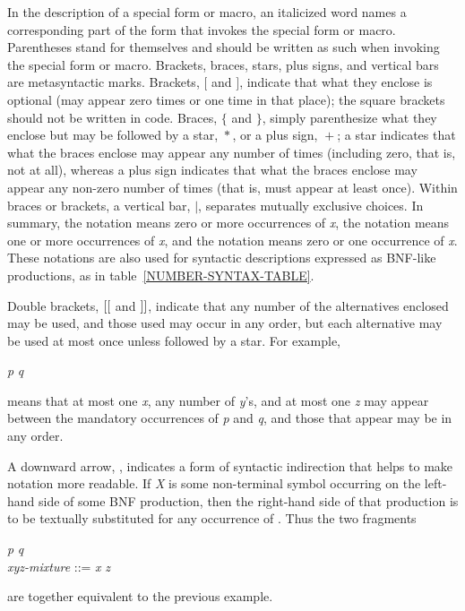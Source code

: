 In the description of a special form or macro, an italicized word names a
corresponding part of the form that invokes the special form or macro.
Parentheses stand for themselves and should be
written as such when invoking the special form or macro.
Brackets, braces, stars, plus signs, and vertical bars are metasyntactic
marks. 
Brackets,
$\lbrack$ and $\rbrack$, indicate that what they enclose is optional
(may appear zero times or one time in that place); the square
brackets should not be written in code.
Braces, $\lbrace$ and $\rbrace$, simply parenthesize what they enclose
but may be followed by a star, ${}*$, or a plus sign, ${}+$;
a star indicates that what the braces enclose may appear any number of times
(including zero, that is, not at all), whereas a plus sign indicates
that what the braces enclose may appear any non-zero number of times
(that is, must appear at least once).  Within braces or brackets,
a vertical bar, $|$, separates mutually exclusive choices.
In summary, the notation  means zero or more occurrences
of \emph{x}, the notation  means one or more occurrences
of \emph{x}, and the notation  means zero or one occurrence
of \emph{x}.  These notations are also used for syntactic
descriptions expressed as BNF-like productions, as
in table~\ref{NUMBER-SYNTAX-TABLE}.

\begin{newer}
Double brackets, $\lbrack\lbrack$ and $\rbrack\rbrack$, indicate that any number of the
alternatives enclosed may be used, and those used
may occur in any order, but each
alternative may be used at most once unless followed by a star.
For example,
\begin{tabbing}
\emph{p}  \emph{q}
\end{tabbing}
means that
at most one \emph{x}, any number of \emph{y}'s, and at most one \emph{z}
may appear between the mandatory occurrences of \emph{p}
and \emph{q}, and those that appear may be in any order.

A downward arrow, \Mind{}, indicates a form of syntactic indirection
that helps to make \Mchoice{~} notation more readable.  If \emph{X} is
some non-terminal symbol occurring on the left-hand side of some BNF
production, then the right-hand
side of that production is to be textually substituted for any occurrence
of .  Thus the two fragments
\begin{tabbing}
\emph{p}  \emph{q} \\
\emph{xyz-mixture} ::= \emph{x\/} {\Mor}  {\Mor} \emph{z\/}
\end{tabbing}
are together equivalent to the previous example.
\end{newer}

